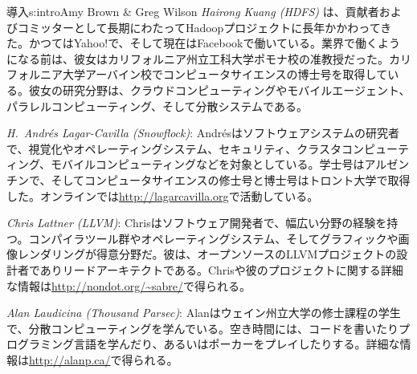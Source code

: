 \begin{aosachapter}{導入}{s:intro}{Amy Brown \& Greg Wilson}
\emph{Hairong Kuang (HDFS)} は、貢献者およびコミッターとして長期にわたってHadoopプロジェクトに長年かかわってきた。かつてはYahoo!で、そして現在はFacebookで働いている。業界で働くようになる前は、彼女はカリフォルニア州立工科大学ポモナ校の准教授だった。カリフォルニア大学アーバイン校でコンピュータサイエンスの博士号を取得している。彼女の研究分野は、クラウドコンピューティングやモバイルエージェント、パラレルコンピューティング、そして分散システムである。

\emph{H.\ Andr\'{e}s Lagar-Cavilla (Snowflock)}: Andr\'{e}sはソフトウェアシステムの研究者で、視覚化やオペレーティングシステム、セキュリティ、クラスタコンピューティング、モバイルコンピューティングなどを対象としている。学士号はアルゼンチンで、そしてコンピュータサイエンスの修士号と博士号はトロント大学で取得した。オンラインでは\url{http://lagarcavilla.org}で活動している。

\emph{Chris Lattner (LLVM)}: Chrisはソフトウェア開発者で、幅広い分野の経験を持つ。コンパイラツール群やオペレーティングシステム、そしてグラフィックや画像レンダリングが得意分野だ。彼は、オープンソースのLLVMプロジェクトの設計者でありリードアーキテクトである。Chrisや彼のプロジェクトに関する詳細な情報は\url{http://nondot.org/~sabre/}で得られる。

\emph{Alan Laudicina (Thousand Parsec)}: Alanはウェイン州立大学の修士課程の学生で、分散コンピューティングを学んでいる。空き時間には、コードを書いたりプログラミング言語を学んだり、あるいはポーカーをプレイしたりする。詳細な情報は\url{http://alanp.ca/}で得られる。


\end{aosachapter}
